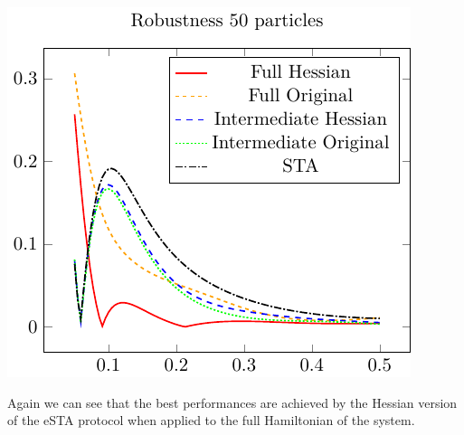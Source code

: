 \begin{center}
    \includegraphics{./gfx/robustness_np50_nlambda5.pdf}
\end{center}

Again we can see that the best performances are achieved by the Hessian version of the eSTA protocol when applied to the full Hamiltonian of the system.

